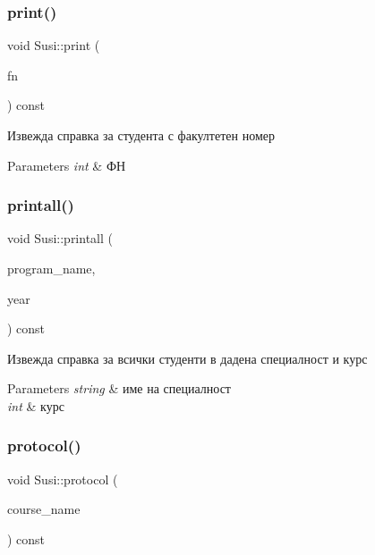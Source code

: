 \subsubsection{\texorpdfstring{print()}{print()}}
{\footnotesize\ttfamily void Susi\+::print (\begin{DoxyParamCaption}\item[{int}]{fn }\end{DoxyParamCaption}) const}



Извежда справка за студента с факултетен номер 


\begin{DoxyParams}{Parameters}
{\em int} & ФН \\
\hline
\end{DoxyParams}
\mbox{\label{class_susi_a36287fc59b1d361e4f868eec9eb9771d}} 
\subsubsection{\texorpdfstring{printall()}{printall()}}
{\footnotesize\ttfamily void Susi\+::printall (\begin{DoxyParamCaption}\item[{const std\+::string \&}]{program\+\_\+name,  }\item[{int}]{year }\end{DoxyParamCaption}) const}



Извежда справка за всички студенти в дадена специалност и курс 


\begin{DoxyParams}{Parameters}
{\em string} & име на специалност \\
\hline
{\em int} & курс \\
\hline
\end{DoxyParams}
\mbox{\label{class_susi_a9e563066928e033a73124ee235b51d26}} 
\subsubsection{\texorpdfstring{protocol()}{protocol()}}
{\footnotesize\ttfamily void Susi\+::protocol (\begin{DoxyParamCaption}\item[{const std\+::string \&}]{course\+\_\+name }\end{DoxyParamCaption}) const}



